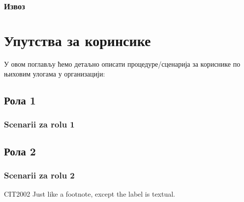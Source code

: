 \documentclass[a4paper,10pt,english]{report}
\begin{document}
\subsection{Извоз}
\label{\detokenize{prirucnik/izvestaji:id8}}

\chapter{Упутства за коринсике}
\label{\detokenize{uputstva/index:id1}}\label{\detokenize{uputstva/index::doc}}
У овом поглављу ћемо детаљно описати процедуре/сценарија за кориснике по њиховим улогама у организацији:


\section{Рола 1}
\label{\detokenize{uputstva/rola1:rola1}}\label{\detokenize{uputstva/rola1:id1}}\label{\detokenize{uputstva/rola1::doc}}

\subsection{Scenarii za rolu 1}
\label{\detokenize{uputstva/rola1:scenarii-za-rolu-1}}

\section{Рола 2}
\label{\detokenize{uputstva/rola2:rola2}}\label{\detokenize{uputstva/rola2:id1}}\label{\detokenize{uputstva/rola2::doc}}

\subsection{Scenarii za rolu 2}
\label{\detokenize{uputstva/rola2:scenarii-za-rolu-2}}
\begin{sphinxthebibliography}{CIT2002}
Just like a footnote, except the label is
textual.
\end{sphinxthebibliography}



\renewcommand{\indexname}{Index}
\printindex
\end{document}
